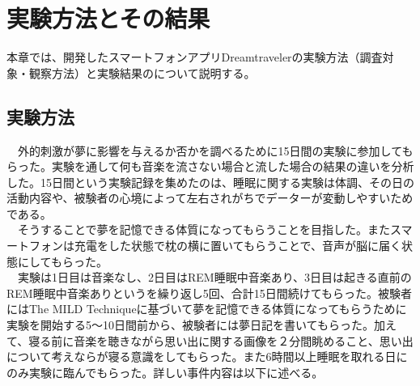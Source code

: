 \chapter{実験方法とその結果}
\label{chap:ledoxea}

本章では、開発したスマートフォンアプリDreamtravelerの実験方法（調査対象・観察方法）と実験結果のについて説明する。

\section{実験方法}
　外的刺激が夢に影響を与えるか否かを調べるために15日間の実験に参加してもらった。実験を通して何も音楽を流さない場合と流した場合の結果の違いを分析した。15日間という実験記録を集めたのは、睡眠に関する実験は体調、その日の活動内容や、被験者の心境によって左右されがちでデーターが変動しやすいためである。\\
　そうすることで夢を記憶できる体質になってもらうことを目指した。またスマートフォンは充電をした状態で枕の横に置いてもらうことで、音声が脳に届く状態にしてもらった。\\
　実験は1日目は音楽なし、2日目はREM睡眠中音楽あり、3日目は起きる直前のREM睡眠中音楽ありというを繰り返し5回、合計15日間続けてもらった。被験者にはThe MILD Techniqueに基づいて夢を記憶できる体質になってもらうために実験を開始する5〜10日間前から、被験者には夢日記を書いてもらった。加えて、寝る前に音楽を聴きながら思い出に関する画像を２分間眺めること、思い出について考えならが寝る意識をしてもらった。また6時間以上睡眠を取れる日にのみ実験に臨んでもらった。詳しい事件内容は以下に述べる。

